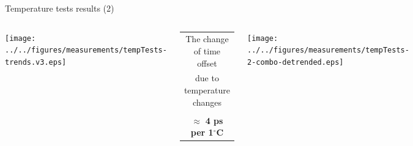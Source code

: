 \documentclass[compress,red]{beamer}
\begin{document}
\begin{frame}{Temperature tests results (2)}


  \begin{columns}[c]
		\hspace{-1.0cm}
		\begin{center}
		\texttt{[image: ../../figures/measurements/tempTests-trends.v3.eps]}
		\end{center}

		\begin{center}
		  \begin{table}[!t] \footnotesize 
		  \begin{tabular}{ c  c }    
		  \multicolumn{2}{c}{ The change of time offset }       \\      
		  \multicolumn{2}{c}{ due to temperature changes}       \\    
		  \multicolumn{2}{c}{}       \\  
		  \multicolumn{2}{c}{ $\approx$ \textbf{4 ps per 1}$^{\circ}$\textbf{C}  }       \\  
		  \end{tabular}
		  \end{table}   		
		\end{center}

		\hspace{-0.8cm}
		\begin{center}
		\texttt{[image: ../../figures/measurements/tempTests-2-combo-detrended.eps]}
		\end{center}



\end{columns}
\end{frame}
\end{document}
